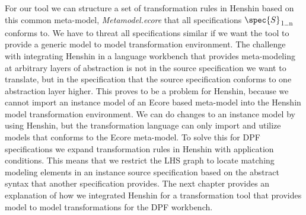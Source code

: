 For our tool we can structure a set of transformation rules in Henshin based on 
this common meta-model, \textit{Metamodel.ecore} that all specifications
$\spec{S}$\textsubscript{1\ldots n} conforms to. We have to threat all
specifications similar if we want the tool to provide a generic model to model
transformation environment. The challenge with integrating Henshin in a language
workbench that provides meta-modeling at arbitrary layers of abstraction is not in the
source specification we want to translate, but in the specification
that the source specification conforms to one abstraction layer higher. This
proves to be a problem for Henshin, because we cannot import an instance model
of an Ecore based meta-model into the Henshin model transformation environment.
We can do changes to an instance model by using Henshin, but the transformation
language can only import and utilize models that conforms to the Ecore
meta-model. To solve this for DPF specifications we expand transformation rules
in Henshin with application conditions. This means that we restrict the LHS
graph to locate matching modeling elements in an instance source specification
based on the abstract syntax that another specification provides. The next
chapter provides an explanation of how we integrated Henshin for a
transformation tool that provides model to model transformations for the DPF
workbench.






